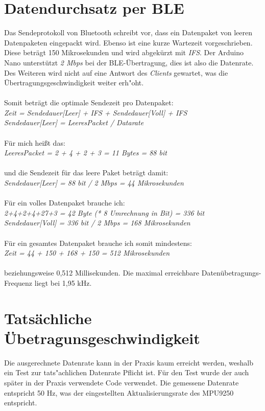 \section{Datendurchsatz per BLE}

Das Sendeprotokoll von Bluetooth schreibt vor, dass ein Datenpaket von
leeren Datenpaketen eingepackt wird. Ebenso ist eine kurze Wartezeit vorgeschrieben. 
Diese beträgt 150 Mikrosekunden und wird abgekürzt mit \textit{IFS}.
Der Arduino Nano unterstützt \textit{2 Mbps} bei der BLE-Übertragung, dies ist also die Datenrate.
Des Weiteren wird nicht auf eine Antwort des \textit{Clients} gewartet, was die 
Übertragungsgeschwindigkeit weiter erh"oht.\\
\\
Somit beträgt die optimale Sendezeit pro Datenpaket:\\
\textit{Zeit = Sendedauer[Leer] + IFS + Sendedauer[Voll] + IFS\\
Sendedauer[Leer] = LeeresPacket / Datarate}\\
\\
Für mich heißt das:\\
\textit{LeeresPacket = 2 + 4 + 2 + 3 = 11 Bytes = 88 bit}\\
\\
und die Sendezeit für das leere Paket beträgt damit:\\
\textit{Sendedauer[Leer] = 88 bit / 2 Mbps = 44 Mikrosekunden}\\
\\
Für ein volles Datenpaket brauche ich:\\
\textit{2+4+2+4+27+3 = 42 Byte (* 8 Umrechnung in Bit)  = 336 bit\\
Sendedauer[Voll] = 336 bit / 2 Mbps = 168 Mikrosekunden}\\
\\
Für ein gesamtes Datenpaket brauche ich somit mindestens:\\
\textit{Zeit = 44 + 150 + 168 + 150 = 512 Mikrosekunden}\\
\\
beziehungsweise 0,512 Millisekunden. Die maximal erreichbare Datenübetragungs-Frequenz
liegt bei 1,95 kHz. 


\section{Tatsächliche Übetragunsgeschwindigkeit}
Die ausgerechnete Datenrate kann in der Praxis kaum erreicht werden, weshalb ein Test zur 
tats"achlichen Datenrate Pflicht ist. Für den Test wurde der auch später in der Praxis verwendete
Code verwendet. Die gemessene Datenrate entspricht 50 Hz, was der eingestellten Aktualisierungsrate 
des MPU9250 entspricht. 